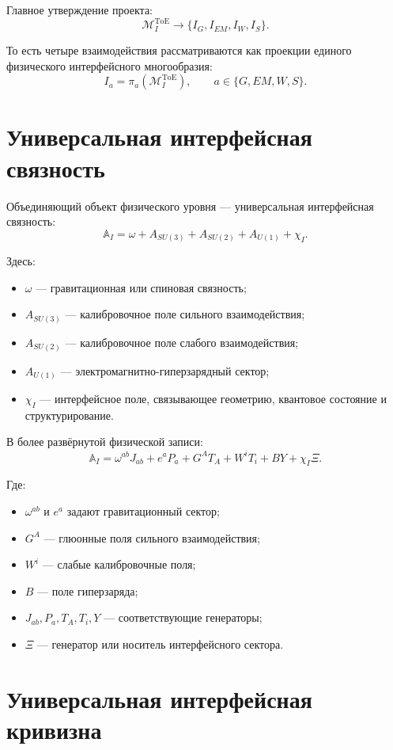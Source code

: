 \documentclass[12pt,a4paper]{article}
\newcommand{\MI}{\mathcal M_I^{\mathrm{ToE}}}
\newcommand{\AI}{\mathbb A_I}
\begin{document}
Главное утверждение проекта:
\[
\boxed{
\mathcal M_I^{\mathrm{ToE}}
\longrightarrow
\{I_G,I_{EM},I_W,I_S\}.
}
\]

То есть четыре взаимодействия рассматриваются как проекции единого физического интерфейсного многообразия:
\[
\boxed{
I_a=\pi_a(\MI),
\qquad
 a\in\{G,EM,W,S\}.
}
\]

\section{Универсальная интерфейсная связность}

Объединяющий объект физического уровня --- универсальная интерфейсная связность:
\[
\boxed{
\AI
=
\omega
+
A_{SU(3)}
+
A_{SU(2)}
+
A_{U(1)}
+
\chi_I.
}
\]

Здесь:
\begin{itemize}[leftmargin=2.2em]
\item \(\omega\) --- гравитационная или спиновая связность;
\item \(A_{SU(3)}\) --- калибровочное поле сильного взаимодействия;
\item \(A_{SU(2)}\) --- калибровочное поле слабого взаимодействия;
\item \(A_{U(1)}\) --- электромагнитно-гиперзарядный сектор;
\item \(\chi_I\) --- интерфейсное поле, связывающее геометрию, квантовое состояние и структурирование.
\end{itemize}

В более развёрнутой физической записи:
\[
\boxed{
\AI
=
\omega^{ab}J_{ab}
+
e^aP_a
+
G^A T_A
+
W^i T_i
+
B Y
+
\chi_I\Xi .
}
\]

Где:
\begin{itemize}[leftmargin=2.2em]
\item \(\omega^{ab}\) и \(e^a\) задают гравитационный сектор;
\item \(G^A\) --- глюонные поля сильного взаимодействия;
\item \(W^i\) --- слабые калибровочные поля;
\item \(B\) --- поле гиперзаряда;
\item \(J_{ab},P_a,T_A,T_i,Y\) --- соответствующие генераторы;
\item \(\Xi\) --- генератор или носитель интерфейсного сектора.
\end{itemize}

\section{Универсальная интерфейсная кривизна}
\end{document}
